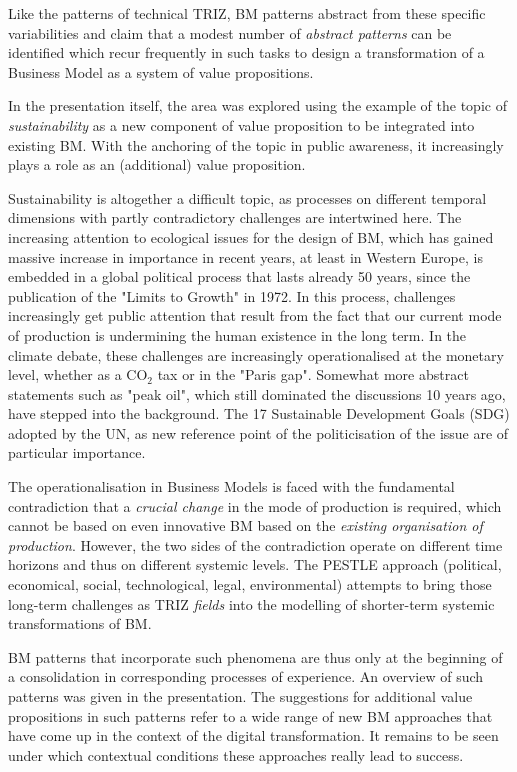 \documentclass[11pt,a4paper]{article}
\begin{document}
Like the patterns of technical TRIZ, BM patterns abstract from these specific
variabilities and claim that a modest number of \emph{abstract patterns} can
be identified which recur frequently in such tasks to design a transformation
of a Business Model as a system of value propositions.

In the presentation itself, the area was explored using the example of the
topic of \emph{sustainability} as a new component of value proposition to be
integrated into existing BM. With the anchoring of the topic in public
awareness, it increasingly plays a role as an (additional) value proposition.

Sustainability is altogether a difficult topic, as processes on different
temporal dimensions with partly contradictory challenges are intertwined here.
The increasing attention to ecological issues for the design of BM, which has
gained massive increase in importance in recent years, at least in Western
Europe, is embedded in a global political process that lasts already 50 years,
since the publication of the "Limits to Growth" in 1972. In this process,
challenges increasingly get public attention that result from the fact that
our current mode of production is undermining the human existence in the long
term. In the climate debate, these challenges are increasingly operationalised
at the monetary level, whether as a CO$_2$ tax or in the "Paris gap". Somewhat
more abstract statements such as "peak oil", which still dominated the
discussions 10 years ago, have stepped into the background. The 17 Sustainable
Development Goals (SDG) adopted by the UN, as new reference point of the
politicisation of the issue are of particular importance.

The operationalisation in Business Models is faced with the fundamental
contradiction that a \emph{crucial change} in the mode of production is
required, which cannot be based on even innovative BM based on the
\emph{existing organisation of production}. However, the two sides of the
contradiction operate on different time horizons and thus on different
systemic levels. The PESTLE approach (political, economical, social,
technological, legal, environmental) attempts to bring those long-term
challenges as TRIZ \emph{fields} into the modelling of shorter-term systemic
transformations of BM.

BM patterns that incorporate such phenomena are thus only at the beginning of
a consolidation in corresponding processes of experience. An overview of such
patterns was given in the presentation. The suggestions for additional value
propositions in such patterns refer to a wide range of new BM approaches that
have come up in the context of the digital transformation. It remains to be
seen under which contextual conditions these approaches really lead to
success.
\end{document}
